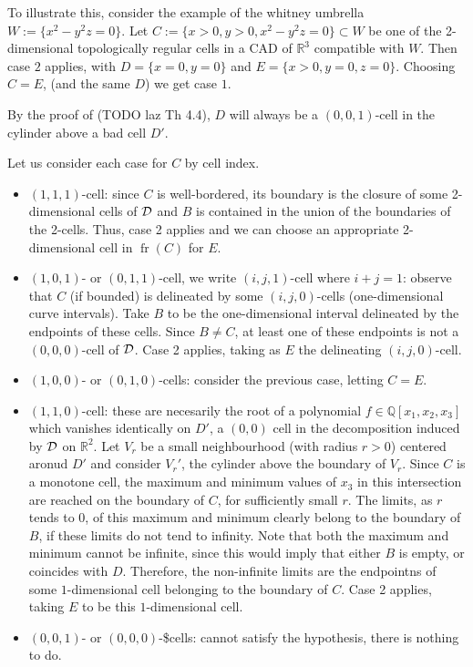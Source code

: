 \documentclass[
]{book}
\theoremstyle{definition}
\theoremstyle{definition}
\theoremstyle{definition}
\theoremstyle{definition}
\theoremstyle{remark}
\begin{document}
To illustrate this, consider the example of the whitney umbrella \(W := \{ x^2 - y^2 z = 0 \}\). Let \(C := \{ x > 0, y > 0, x^2 - y^2 z = 0 \} \subset W\) be one of the 2-dimensional topologically regular cells in a CAD of \(\mathbb{R}^3\) compatible with \(W\).
Then case \(2\) applies, with \(D = \{ x = 0, y = 0 \}\) and \(E = \{ x > 0, y = 0, z = 0 \}\).
Choosing \(C = E\), (and the same \(D\)) we get case \(1\).

By the proof of (TODO laz Th 4.4), \(D\) will always be a \((0,0,1)\)-cell in the cylinder above a bad cell \(D'\).

Let us consider each case for \(C\) by cell index.

\begin{itemize}
\item
  \((1,1,1)\)-cell: since \(C\) is well-bordered, its boundary is the closure of some 2-dimensional cells of \(\cal D\) and \(B\) is contained in the union of the boundaries of the 2-cells. Thus, case 2 applies and we can choose an appropriate 2-dimensional cell in \({\operatorname{fr} \left( C \right)}\) for \(E\).
\item
  \((1,0,1)\)- or \((0,1,1)\)-cell, we write \((i,j,1)\)-cell where \(i+j=1\): observe that \(C\) (if bounded) is delineated by some \((i,j,0)\)-cells (one-dimensional curve intervals). Take \(B\) to be the one-dimensional interval delineated by the endpoints of these cells. Since \(B \neq C\), at least one of these endpoints is not a \((0,0,0)\)-cell of \(\cal D\). Case 2 applies, taking as \(E\) the delineating \((i,j,0)\)-cell.
\item
  \((1,0,0)\)- or \((0,1,0)\)-cells: consider the previous case, letting \(C = E\).
\item
  \((1,1,0)\)-cell: these are necesarily the root of a polynomial \(f \in \mathbb{Q}[x_1,x_2,x_3]\) which vanishes identically on \(D'\), a \((0,0)\) cell in the decomposition induced by \(\cal D\) on \(\mathbb{R}^2\).
  Let \(V_r\) be a small neighbourhood (with radius \(r > 0\)) centered aronud \(D'\) and consider \(V_r'\), the cylinder above the boundary of \(V_r\). Since \(C\) is a monotone cell, the maximum and minimum values of \(x_3\) in this intersection are reached on the boundary of \(C\), for sufficiently small \(r\). The limits, as \(r\) tends to \(0\), of this maximum and minimum clearly belong to the boundary of \(B\), if these limits do not tend to infinity. Note that both the maximum and minimum cannot be infinite, since this would imply that either \(B\) is empty, or coincides with \(D\). Therefore, the non-infinite limits are the endpointns of some \(1\)-dimensional cell belonging to the boundary of \(C\). Case 2 applies, taking \(E\) to be this \(1\)-dimensional cell.
\item
  \((0,0,1)\)- or \((0,0,0)\)-\$cells: cannot satisfy the hypothesis, there is nothing to do.
\end{itemize}
\end{document}
